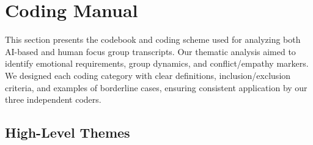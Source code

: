 \documentclass[acmsmall]{acmart}
\begin{document}
\section{Coding Manual}
\label{sec:coding_manual}

This section presents the codebook and coding scheme used for analyzing both AI-based and human focus group transcripts. Our thematic analysis aimed to identify emotional requirements, group dynamics, and conflict/empathy markers. We designed each coding category with clear definitions, inclusion/exclusion criteria, and examples of borderline cases, ensuring consistent application by our three independent coders.

\subsection{High-Level Themes}
\end{document}
